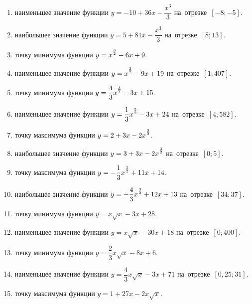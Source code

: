 \documentclass[a4paper,10pt]{article}
\begin{document}
\begin{enumerate}
\item {} наименьшее значение функции $y=-10 +36x-\dfrac{x^3}{3}$ на~отрезке~$\left[-8;-5\right]$.

\item {} наибольшее значение функции $y=5 +81x-\dfrac{x^3}{3}$ на~отрезке~$\left[8;13\right]$.

\item {} точку минимума функции $y=x\strut^{\frac{3}{2}} -6x+9$.

\item {} наименьшее значение функции $y=x\strut^{\frac{3}{2}} -9x+19$ на~отрезке~$\left[1;407\right]$.

\item {} точку минимума функции $y=\dfrac{4}{3}x\strut^{\frac{3}{2}} -3x+15$.

\item {} наименьшее значение функции $y=\dfrac{1}{3}x\strut^{\frac{3}{2}} -3x+24$ на~отрезке~$\left[4;582\right]$.

\item {} точку максимума функции $y=2+3x-2x\strut^{\frac{3}{2}}$.

\item {} наибольшее значение функции $y=3+3x-2x\strut^{\frac{3}{2}}$ на~отрезке~$\left[0;5\right]$.

\item {} точку максимума функции $y=-\dfrac{1}{3}x\strut^{\frac{3}{2}} +11x+14$.

\item {} наибольшее значение функции $y=-\dfrac{4}{3}x\strut^{\frac{3}{2}} +12x+13$ на~отрезке~$\left[34;37\right]$.

\item {} точку минимума функции $y=x\sqrt{x} -3x+28$.

\item {} наименьшее значение функции $y=x\sqrt{x} -30x+18$ на~отрезке~$\left[0;400\right]$.

\item {} точку минимума функции $y=\dfrac{2}{3}x\sqrt{x} -8x+6$.

\item {} наименьшее значение функции $y=\dfrac{4}{3}x\sqrt{x} -3x+71$ на~отрезке~$\left[0,25;31\right]$.

\item {} точку максимума функции $y=1+27x -2x\sqrt{x}$.


\end{enumerate}
\end{document}
